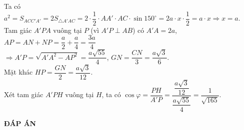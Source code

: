 \begin{ex}
{		Ta có $a^2=S_{ACC'A'}=2S_{\triangle A'AC}=2\cdot \dfrac{1}{2}\cdot AA'\cdot AC\cdot \sin 150^\circ=2a\cdot x\cdot \dfrac{1}{2}=a\cdot x\Rightarrow  x=a.$\\
		Tam giác $A'PA$ vuông tại $P$ (vì $A'P\perp AB$) có $A'A=2a$, $AP=AN+NP=\dfrac{a}{2}+\dfrac{a}{4}=\dfrac{3a}{4}$\\
		$\Rightarrow A'P=\sqrt{A'A^2-AP^2}=\dfrac{a\sqrt{55}}{4}$, $GN=\dfrac{CN}{3}=\dfrac{a\sqrt{3}}{6}$.\\
		Mặt khác $HP=\dfrac{GN}{2}=\dfrac{a\sqrt{3}}{12}$.\\
		Xét tam giác $A'PH$ vuông tại $H$, ta có $\cos \varphi=\dfrac{PH}{A'P}=\dfrac{\dfrac{a\sqrt{3}}{12}}{\dfrac{a\sqrt{55}}{4}}=\dfrac{1}{\sqrt{165}}$.
	}
\end{ex}


\newpage
\begin{center}
	\textbf{ĐÁP ÁN}
\end{center}
\begin{multicols}{10}
	 
\end{multicols}